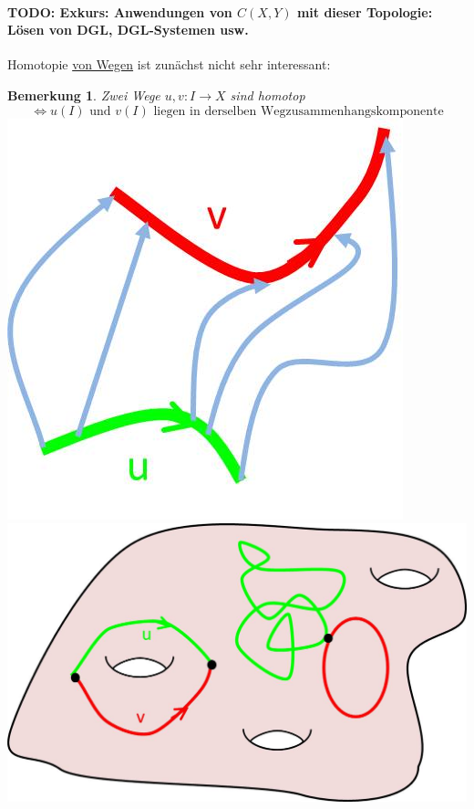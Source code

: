 \documentclass[a4paper,11pt,notitlepage]{report}
\newtheorem{remark}{Bemerkung}[chapter]
\begin{document}
\paragraph{TODO: Exkurs: Anwendungen von $C(X,Y)$ mit dieser Topologie: Lösen von DGL, DGL-Systemen usw.}

Homotopie \underline{von Wegen} ist zunächst nicht sehr interessant:

\begin{remark}{}
	Zwei Wege $u,v \colon I \rightarrow X$ sind homotop
	$$\Leftrightarrow u(I) \text{ und } v(I) \text{ liegen in derselben Wegzusammenhangskomponente}$$
	\includegraphics[scale=0.5]{images/Homotopie_zwischen_Wegen.jpg} \includegraphics[scale=0.35]{images/Homotopie_zwischen_Wegen2.jpg}
\end{remark}
\end{document}

